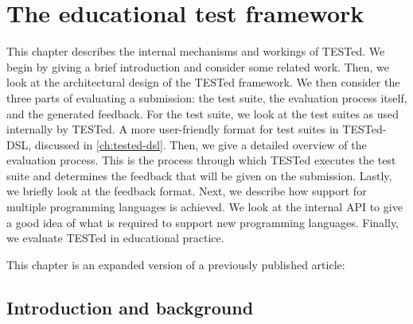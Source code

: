 \documentclass[../main]{subfiles}
\begin{document}
\chapter{The \tested{} educational test framework}\label{ch:tested1}

This chapter describes the internal mechanisms and workings of TESTed.
We begin by giving a brief introduction and consider some related work.
Then, we look at the architectural design of the TESTed framework.
We then consider the three parts of evaluating a submission:
the test suite, the evaluation process itself, and the generated feedback.
For the test suite, we look at the test suites as used internally by TESTed.
A more user-friendly format for test suites in TESTed-DSL, discussed in \cref{ch:tested-dsl}.
Then, we give a detailed overview of the evaluation process.
This is the process through which TESTed executes the test suite and determines the feedback that will be given on the submission.
Lastly, we briefly look at the feedback format.
Next, we describe how support for multiple programming languages is achieved.
We look at the internal API to give a good idea of what is required to support new programming languages.
Finally, we evaluate TESTed in educational practice.

This chapter is an expanded version of a previously published article:
\par
{}

\section{Introduction and background}\label{sec:tested1-introduction-and-background}
\end{document}

